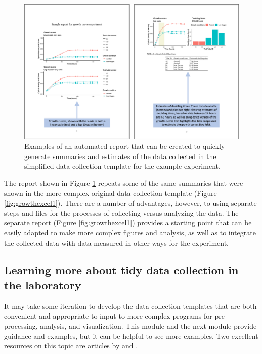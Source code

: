 \documentclass[]{tufte-book}
\begin{document}
\begin{figure}
\includegraphics[width=\textwidth]{figures/growth_curve_report} \caption[Examples of an automated report that can be created to quickly generate summaries and estimates of the data collected in the simplified data collection template for the example experiment]{Examples of an automated report that can be created to quickly generate summaries and estimates of the data collected in the simplified data collection template for the example experiment.}\label{fig:growthreport1}
\end{figure}

The report shown in Figure \ref{fig:growthreport1} repeats some of the same summaries
that were shown in the more complex original data collection template
(Figure \ref{fig:growthexcel1}). There are a number of advantages, however, to using
separate steps and files for the processes of collecting versus analyzing the data.
The separate report (Figure \ref{fig:growthexcel1}) provides a starting point that can
be easily adapted to make more complex figures and analysis, as well as to integrate
the collected data with data measured in other ways for the experiment.

\subsection{Learning more about tidy data collection in the laboratory}\label{learning-more-about-tidy-data-collection-in-the-laboratory}

It may take some iteration to develop the data collection templates that are both
convenient and appropriate to input to more complex programs for pre-processing,
analysis, and visualization. This module and the next module provide guidance and
examples, but it can be helpful to see more examples. Two excellent resources on this
topic are articles by \citet{ellis2018share} and \citet{broman2018data}.
\end{document}
